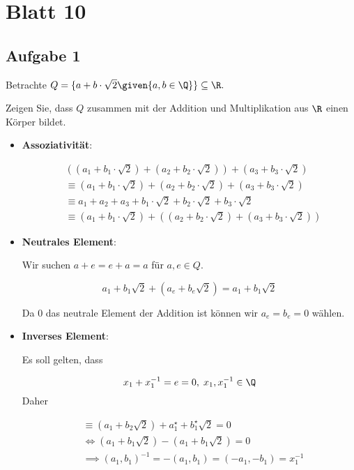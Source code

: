 \section*{Blatt 10}
%

\subsection*{Aufgabe 1}

Betrachte $Q = \{a + b \cdot \sqrt{2} \given{ a, b \in \Q}\} \subseteq \R.$

Zeigen Sie, dass $Q$ zusammen mit der Addition und Multiplikation aus $\R$ einen Körper bildet.

\begin{itemize}
  \item \textbf{Assoziativität}:

  \begin{align*}
    &((a_1 + b_1 \cdot \sqrt{2}) + (a_2 + b_2 \cdot \sqrt{2})) + (a_3 + b_3 \cdot \sqrt{2}) \\
    &\equiv (a_1 + b_1 \cdot \sqrt{2}) + (a_2 + b_2 \cdot \sqrt{2}) + (a_3 + b_3 \cdot \sqrt{2}) \\
    &\equiv a_1 + a_2 + a_3 + b_1 \cdot \sqrt{2} + b_2 \cdot \sqrt{2} + b_3 \cdot \sqrt{2} \\
    &\equiv (a_1 + b_1 \cdot \sqrt{2}) + ((a_2 + b_2 \cdot \sqrt{2}) + (a_3 + b_3 \cdot \sqrt{2}))
  \end{align*}

  \item \textbf{Neutrales Element}:

  Wir suchen $a + e = e + a = a$ für $a, e \in Q$.

  \[  a_1 + b_1 \sqrt{2} + (a_e + b_e \sqrt{2}) = a_1 + b_1 \sqrt{2}  \]

  Da 0 das neutrale Element der Addition ist können wir $a_e = b_e = 0$ wählen.

  \item \textbf{Inverses Element}:

  Es soll gelten, dass

  \[  x_1 + x_1^{-1} = e = 0, \; x_1, x_1^{-1} \in \Q  \]
 Daher

 \begin{align*}
   &\equiv (a_1 + b_2 \sqrt{2}) + a_1^{\star} + b_1^{\star}\sqrt{2} = 0 \\
   &\iff (a_1 + b_1 \sqrt{2}) - (a_1 + b_1 \sqrt{2}) = 0 \\
   &\implies (a_1, b_1)^{-1} = -(a_1, b_1) = (-a_1, -b_1) = x_1^{-1}
 \end{align*}


\end{itemize}
